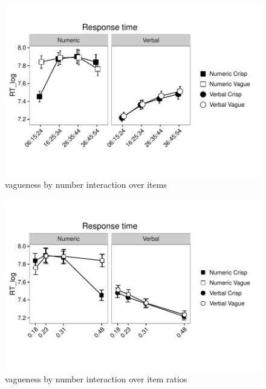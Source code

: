 \documentclass[a4paper,12pt]{article}\usepackage[]{graphicx}\usepackage[]{color}
\makeatletter
\def\maxwidth{ %
  \ifdim\Gin@nat@width>\linewidth
    \linewidth
  \else
    \Gin@nat@width
  \fi
}
\newenvironment{knitrout}{}{} %
\makeatother
\begin{document}
\begin{knitrout}\scriptsize
{}\color{fgcolor}\begin{figure}[hbtp]

{\centering \includegraphics[width=\maxwidth]{figure/graphics-plotInt1-1} 

}

\caption[vagueness by number interaction over items]{vagueness by number interaction over items}\label{fig:plotInt1}
\end{figure}


\end{knitrout}

\clearpage

\begin{knitrout}\scriptsize
{}\color{fgcolor}\begin{figure}[hbtp]

{\centering \includegraphics[width=\maxwidth]{figure/graphics-plotInt2-1} 

}

\caption[vagueness by number interaction over item ratios]{vagueness by number interaction over item ratios}\label{fig:plotInt2}
\end{figure}


\end{knitrout}
\end{document}
